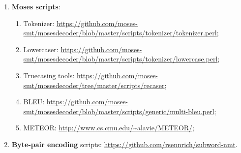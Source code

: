 \begin{enumerate}
	\item \textbf{Moses scripts}:
	\begin{enumerate}
	    \item Tokenizer: \url{https://github.com/moses-smt/mosesdecoder/blob/master/scripts/tokenizer/tokenizer.perl};
	    \item Lowercaser: \url{https://github.com/moses-smt/mosesdecoder/blob/master/scripts/tokenizer/lowercase.perl};
	    \item Truecasing tools: \url{https://github.com/moses-smt/mosesdecoder/tree/master/scripts/recaser};
	    \item BLEU: \url{https://github.com/moses-smt/mosesdecoder/blob/master/scripts/generic/multi-bleu.perl};
	    \item METEOR: \url{http://www.cs.cmu.edu/~alavie/METEOR/};
	\end{enumerate}
	\item \textbf{Byte-pair encoding} scripts: \url{https://github.com/rsennrich/subword-nmt}.
\end{enumerate}